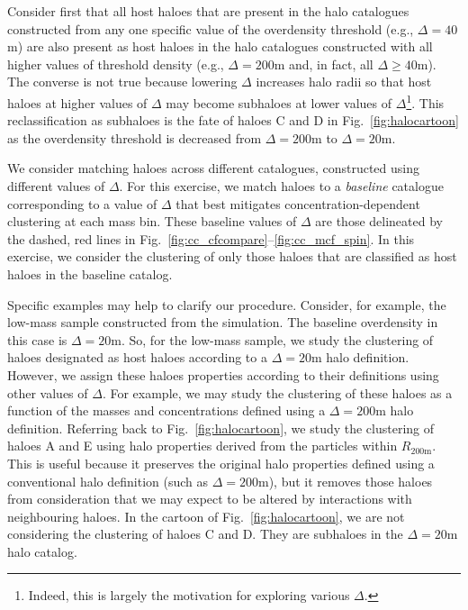 \documentclass[usenatbib,fleqn]{mnras}
\begin{document}
Consider first that all host haloes that are present in the halo catalogues constructed from any one specific value of the overdensity threshold (e.g., $\Delta=40$m) are also present as host haloes in the halo catalogues constructed with all higher values of threshold density (e.g., $\Delta=200$m and, in fact, all $\Delta \ge 40$m). The converse is not true because lowering $\Delta$ increases halo radii so that host haloes at higher values of $\Delta$ may become subhaloes at lower values of $\Delta$\footnote{Indeed, this is largely the motivation for exploring various $\Delta$.}. This reclassification as subhaloes is the fate of haloes C and D in Fig.~\ref{fig:halocartoon} as the overdensity threshold is decreased from $\Delta=200$m to $\Delta=20$m. 

We consider matching haloes across different catalogues, constructed using different values of $\Delta$. For this exercise, we match haloes to a {\em baseline} catalogue corresponding to a value of $\Delta$ that best mitigates concentration-dependent clustering at each mass bin. These baseline values of $\Delta$ are those delineated by the dashed, red lines in Fig.~\ref{fig:cc_cfcompare}--\ref{fig:cc_mcf_spin}. In this exercise, we consider the clustering of only those haloes that are classified as host haloes in the baseline catalog. 

Specific examples may help to clarify our procedure. Consider, for example, the low-mass sample constructed from the \simA{} simulation. The baseline overdensity in this case is $\Delta=20$m. So, for the low-mass sample, we study the clustering of haloes designated as host haloes according to a $\Delta=20$m halo definition. However, we assign these haloes properties according to their definitions using other values of $\Delta$. For example, we may study the clustering of these haloes as a function of the masses and concentrations defined using a $\Delta=200$m halo definition. Referring back to Fig.~\ref{fig:halocartoon}, we study the clustering of haloes A and E using halo properties derived from the particles within $R_{200{\mathrm{m}}}$. This is useful because it preserves the original halo properties defined using a conventional halo definition (such as $\Delta=200$m), but it removes those haloes from consideration that we may expect to be altered by interactions with neighbouring haloes. In the cartoon of Fig.~\ref{fig:halocartoon}, we are not considering the clustering of haloes C and D. They are subhaloes in the $\Delta=20$m halo catalog. 
\end{document}
